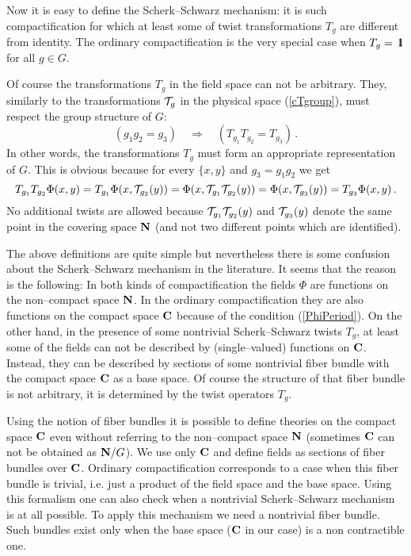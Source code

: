 \documentclass[a4paper,12pt]{article}
\def\cT{{\cal T}}
\def\bC{{\bf C}}
\def\bN{{\bf N}}
\def\id{{\,\,{\rm l}\!\!\!1}}
\begin{document}
Now it is easy to define the Scherk--Schwarz mechanism: it is
such compactification for which at least some of twist transformations
$T_g$ are different from identity. The ordinary compactification is
the very special case when $T_g=\id$ for all $g\in G$.


Of course the transformations $T_g$ in the field space can not be
arbitrary. They, similarly to  the transformations $\cT_g$ in the
physical space (\ref{cTgroup}), must respect the group structure of
$G$: 
\begin{equation}
(g_1g_2=g_3)
\quad\Rightarrow\quad
(T_{g_1}T_{g_2}=T_{g_3})
\,.
\label{Tgroup}
\end{equation}
In other words, the transformations $T_g$ must form an appropriate
representation of $G$. 
This is obvious because for every $\{x,y\}$ and $g_3=g_1g_2$ we get
\begin{equation}
T_{g_1}T_{g_2}\Phi(x,y)=T_{g_1}\Phi(x,\cT_{g_2}(y))
=
\Phi(x,\cT_{g_1}\cT_{g_2}(y))=\Phi(x,\cT_{g_3}(y))
=T_{g_3}\Phi(x,y)
\,.
\end{equation}
No additional twists are allowed because $\cT_{g_1}\cT_{g_2}(y)$ and 
$\cT_{g_3}(y)$ denote the same point in the covering space $\bN$ 
(and not two different points which are identified). 


The above definitions are quite simple but nevertheless there is some
confusion about the Scherk--Schwarz mechanism in the literature. It
seems that the reason is the following: In both kinds of
compactification the fields $\Phi$ are functions on the non--compact
space $\bN$. In the ordinary compactification they are also functions
on the compact space $\bC$ because of the condition (\ref{PhiPeriod}).
On the other hand, in the presence of some nontrivial Scherk--Schwarz
twists $T_g$, at least some of the fields can not be described by
(single--valued) functions on $\bC$. Instead, they can be described
by sections of some nontrivial fiber bundle with the compact
space $\bC$ as a base space. Of course the structure of that fiber
bundle is not arbitrary, it is determined by the twist operators
$T_g$. 


Using the notion of fiber bundles it is possible to define theories on
the compact space $\bC$ even without referring to the non--compact
space $\bN$ (sometimes $\bC$ can not be obtained as $\bN/G$). We use
only $\bC$ and define fields as sections of fiber bundles over
$\bC$. Ordinary compactification corresponds to a case when this fiber
bundle is trivial, i.e. just a product of the field space and the base
space. Using this formalism one can also check when a nontrivial
Scherk--Schwarz mechanism is at all possible. To apply this mechanism
we need a nontrivial fiber bundle. Such bundles exist only when the 
base space ($\bC$ in our case) is a non contractible one.
\end{document}
